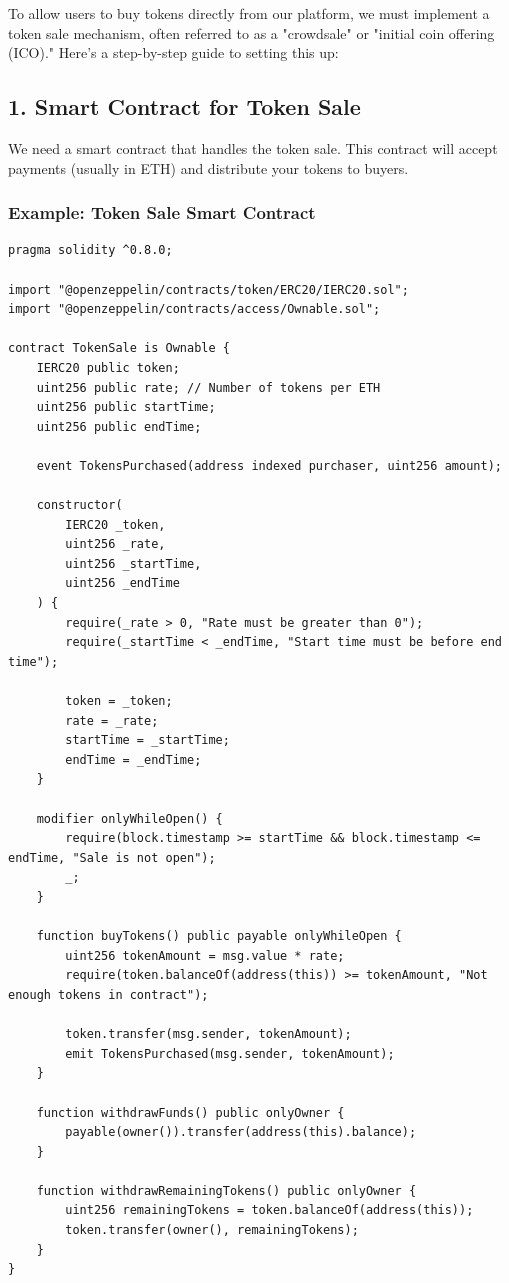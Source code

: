 \documentclass{tufte-handout}
\begin{document}
To allow users to buy tokens directly from our platform, we must implement a token sale mechanism, often referred to as a "crowdsale" or "initial coin offering (ICO)."
Here's a step-by-step guide to setting this up:

\subsection*{1. Smart Contract for Token Sale}

We need a smart contract that handles the token sale. This contract will accept payments (usually in ETH) and distribute your tokens to buyers.

\subsubsection*{Example: Token Sale Smart Contract}

\begin{verbatim}
pragma solidity ^0.8.0;

import "@openzeppelin/contracts/token/ERC20/IERC20.sol";
import "@openzeppelin/contracts/access/Ownable.sol";

contract TokenSale is Ownable {
    IERC20 public token;
    uint256 public rate; // Number of tokens per ETH
    uint256 public startTime;
    uint256 public endTime;

    event TokensPurchased(address indexed purchaser, uint256 amount);

    constructor(
        IERC20 _token,
        uint256 _rate,
        uint256 _startTime,
        uint256 _endTime
    ) {
        require(_rate > 0, "Rate must be greater than 0");
        require(_startTime < _endTime, "Start time must be before end time");

        token = _token;
        rate = _rate;
        startTime = _startTime;
        endTime = _endTime;
    }

    modifier onlyWhileOpen() {
        require(block.timestamp >= startTime && block.timestamp <= endTime, "Sale is not open");
        _;
    }

    function buyTokens() public payable onlyWhileOpen {
        uint256 tokenAmount = msg.value * rate;
        require(token.balanceOf(address(this)) >= tokenAmount, "Not enough tokens in contract");

        token.transfer(msg.sender, tokenAmount);
        emit TokensPurchased(msg.sender, tokenAmount);
    }

    function withdrawFunds() public onlyOwner {
        payable(owner()).transfer(address(this).balance);
    }

    function withdrawRemainingTokens() public onlyOwner {
        uint256 remainingTokens = token.balanceOf(address(this));
        token.transfer(owner(), remainingTokens);
    }
}
\end{verbatim}
\end{document}
